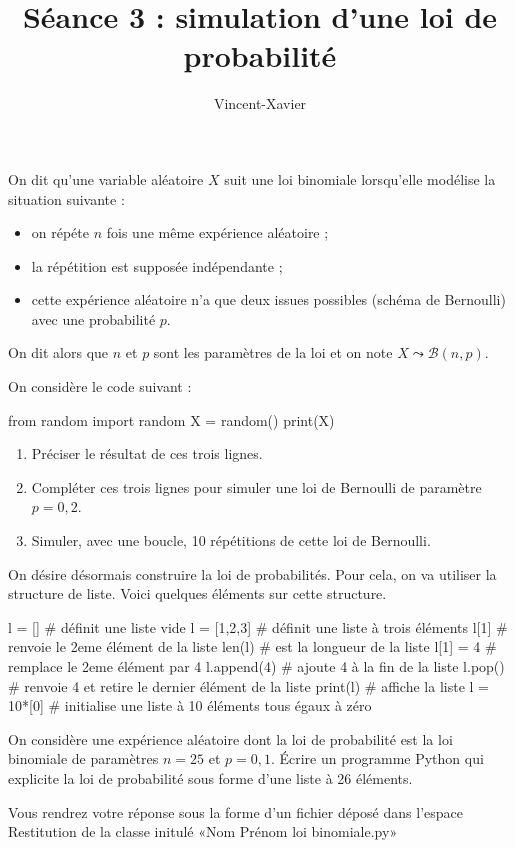 \documentclass[a4paper,french,12pt]{article}
\title{Séance 3 : simulation d'une loi de probabilité}
\author{Vincent-Xavier \bsc{Jumel}}
\begin{document}
\maketitle
\thispagestyle{fancy}

\begin{definition}
  On dit qu'une variable aléatoire $X$ suit une loi binomiale lorsqu'elle
  modélise la situation suivante :
  \begin{itemize}
    \item on répéte $n$ fois une même expérience aléatoire ;
    \item la répétition est supposée indépendante ;
    \item cette expérience aléatoire n'a que deux issues possibles (schéma
      de Bernoulli) avec une probabilité $p$.
  \end{itemize}
  On dit alors que $n$ et $p$ sont les paramètres de la loi et on note $X
  \leadsto \mathcal{B}(n,p)$.
\end{definition}

\noindent On considère le code suivant :
\begin{pyblock}
  from random import random
  X = random()
  print(X)
\end{pyblock}

\begin{question}
  \begin{enumerate}
    \item Préciser le résultat de ces trois lignes.
    \item Compléter ces trois lignes pour simuler une loi de Bernoulli de
      paramètre $p = 0,2$.
    \item Simuler, avec une boucle, 10 répétitions de cette loi de
      Bernoulli.
  \end{enumerate}
\end{question}

On désire désormais construire la loi de probabilités. Pour cela, on va
utiliser la structure de liste. Voici quelques éléments sur cette structure.

\begin{pyblock}
  l = [] # définit une liste vide
  l = [1,2,3] # définit une liste à trois éléments
  l[1] # renvoie le 2eme élément de la liste
  len(l) # est la longueur de la liste
  l[1] = 4 # remplace le 2eme élément par 4
  l.append(4) # ajoute 4 à la fin de la liste
  l.pop() # renvoie 4 et retire le dernier élément de la liste
  print(l) # affiche la liste
  l = 10*[0] # initialise une liste à 10 éléments tous égaux à zéro
\end{pyblock}

\begin{question}
  On considère une expérience aléatoire dont la loi de probabilité est la
  loi binomiale de paramètres $n = 25$ et $p = 0,1$. Écrire un programme
  Python qui explicite la loi de probabilité sous forme d'une liste à 26
  éléments.

  Vous rendrez votre réponse sous la forme d'un fichier déposé dans l'espace
  Restitution de la classe initulé «Nom Prénom loi binomiale.py»
\end{question}
\end{document}
